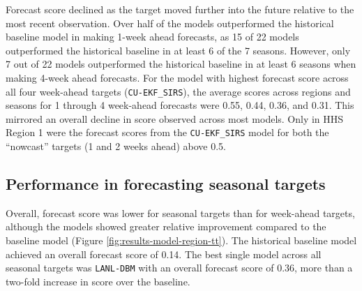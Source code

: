 \documentclass[9pt,twocolumn,twoside]{pnas-new}\usepackage[]{graphicx}\usepackage[]{color}
\begin{document}
Forecast score declined as the target moved further into the future relative to the most recent observation.
Over half of the models outperformed the historical baseline model in making 1-week ahead forecasts, as 15 of 22 models outperformed the historical baseline in at least 6 of the 7 seasons.
However, only 7 out of 22 models outperformed the historical baseline in at least 6 seasons when making 4-week ahead forecasts.
For the model with highest forecast score across all four week-ahead targets ({\tt CU-EKF\_SIRS}), the average scores across regions and seasons for 1 through 4 week-ahead forecasts were 
0.55, 
0.44, 
0.36, and 
0.31.
This mirrored an overall decline in score observed across most models.
Only in HHS Region 1 were the forecast scores from the {\tt CU-EKF\_SIRS} model for both the ``nowcast'' targets (1 and 2 weeks ahead) above 0.5.


\subsection*{Performance in forecasting seasonal targets}




Overall, forecast score was lower for seasonal targets than for week-ahead targets, although the models showed greater relative improvement compared to the baseline model (Figure \ref{fig:results-model-region-tt}).
The historical baseline model achieved  an overall forecast score of 
0.14.
The best single model across all seasonal targets was {\tt LANL-DBM} with an overall forecast score of 
0.36, more than a two-fold increase in score over the baseline.
\end{document}
